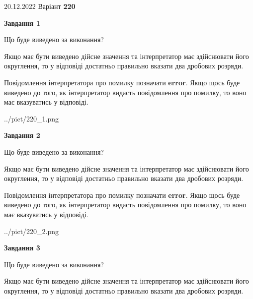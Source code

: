 \documentclass[12pt, ukrainian]{article}
\begin{document}
{20.12.2022 Варіант \No \textbf { 220 }\par}
{
\begin {Large}

{\begin {center}\textbf{Завдання 1}\end {center}}\par
Що буде виведено за виконання? \par

Якщо має бути виведено дійсне значення та інтерпретатор має здійснювати його округлення, 
то у відповіді достатньо правильно вказати два дробових розряди.

Повідомлення інтерпретатора про помилку позначати \textbf{error}.
Якщо щось буде виведено до того, як інтерпретатор видасть повідомлення про помилку, 
то воно має вказуватись у відповіді. \par

\begin{center}
	{../pict/220_1.png}
\end{center}
\newpage

{\begin {center}\textbf{Завдання 2}\end {center}}\par
Що буде виведено за виконання? \par

Якщо має бути виведено дійсне значення та інтерпретатор має здійснювати його округлення, 
то у відповіді достатньо правильно вказати два дробових розряди.

Повідомлення інтерпретатора про помилку позначати \textbf{error}.
Якщо щось буде виведено до того, як інтерпретатор видасть повідомлення про помилку, 
то воно має вказуватись у відповіді. \par

\begin{center}
	{../pict/220_2.png}
\end{center}
\newpage

{\begin {center}\textbf{Завдання 3}\end {center}}\par
Що буде виведено за виконання? \par

Якщо має бути виведено дійсне значення та інтерпретатор має здійснювати його округлення, 
то у відповіді достатньо правильно вказати два дробових розряди.


\end{Large}}
\end{document}
